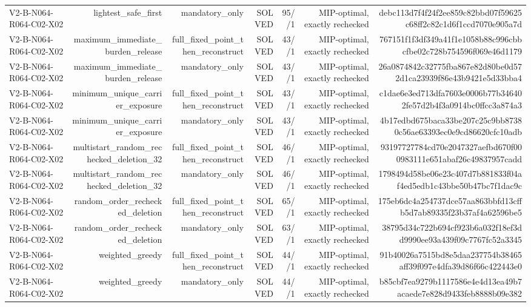 {\begin{longtable}{lrrrrrr}
V2-B-N064-R064-C02-X02 & lightest\_safe\_first & mandatory\_only & SOLVED & 95//1 & MIP-optimal, exactly rechecked & debc113d7f4f24f2ee859c82bbd07f59625c68ff2c82c1d6f1ccd7070e905a7d \\
V2-B-N064-R064-C02-X02 & maximum\_immediate\_burden\_release & full\_fixed\_point\_then\_reconstruct & SOLVED & 43//1 & MIP-optimal, exactly rechecked & 767151f1f3df349a41f1e1058b88c996cbbcfbe02c728b754596f069e46d1179 \\
V2-B-N064-R064-C02-X02 & maximum\_immediate\_burden\_release & mandatory\_only & SOLVED & 43//1 & MIP-optimal, exactly rechecked & 26a0874842c32775fba867e82d80be0d572d1ca23939f86e43b9421e5d33bba4 \\
V2-B-N064-R064-C02-X02 & minimum\_unique\_carrier\_exposure & full\_fixed\_point\_then\_reconstruct & SOLVED & 43//1 & MIP-optimal, exactly rechecked & c1dae6e3ed713dfa7603e0006b77b346402fe57d2b4f3a0914bc0ffcc3a874a3 \\
V2-B-N064-R064-C02-X02 & minimum\_unique\_carrier\_exposure & mandatory\_only & SOLVED & 43//1 & MIP-optimal, exactly rechecked & 4b17edbd675baca33be207c25c9bb87380c56ae63393ec0e9cd86620cfc10adb \\
V2-B-N064-R064-C02-X02 & multistart\_random\_rechecked\_deletion\_32 & full\_fixed\_point\_then\_reconstruct & SOLVED & 46//1 & MIP-optimal, exactly rechecked & 93197727784cd70e2047327aefbd670f000983111e651abaf26c49837957cadd \\
V2-B-N064-R064-C02-X02 & multistart\_random\_rechecked\_deletion\_32 & mandatory\_only & SOLVED & 46//1 & MIP-optimal, exactly rechecked & 1798494d58be06e23c407d7b881833f04af4ed5edb1c43bbe50b47bc7f1dac9c \\
V2-B-N064-R064-C02-X02 & random\_order\_rechecked\_deletion & full\_fixed\_point\_then\_reconstruct & SOLVED & 65//1 & MIP-optimal, exactly rechecked & 175eb6dc4a254737dce57aa863bbfd13cffb5d7ab89335f23b37af4a62596be5 \\
V2-B-N064-R064-C02-X02 & random\_order\_rechecked\_deletion & mandatory\_only & SOLVED & 63//1 & MIP-optimal, exactly rechecked & 38795d34c722b694cf923b6a032f18ef3dd9990ee93a439f09c7767fc52a3345 \\
V2-B-N064-R064-C02-X02 & weighted\_greedy & full\_fixed\_point\_then\_reconstruct & SOLVED & 44//1 & MIP-optimal, exactly rechecked & 91b40026a7515bd8e5daa237754b38465aff39f097e4dfa39d86f66c422443e0 \\
V2-B-N064-R064-C02-X02 & weighted\_greedy & mandatory\_only & SOLVED & 44//1 & MIP-optimal, exactly rechecked & b85cbf7ea9279b1117586e4e4d13ea49b7acaede7e828d9433feb8888b09e382 \\

\end{longtable}}
